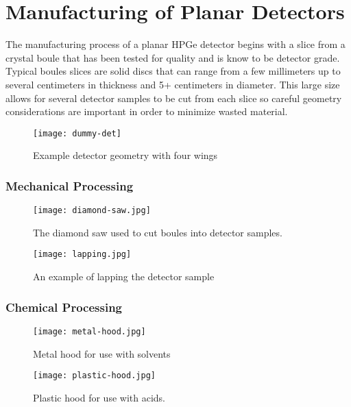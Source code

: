 \chapter{Manufacturing of Planar Detectors}
The manufacturing process of a planar HPGe detector begins with a slice from a crystal boule that has been tested for quality and is know to be detector grade. Typical boules slices are solid discs that can range from a few millimeters up to several centimeters in thickness and 5+ centimeters in diameter. This large size allows for several detector samples to be cut from each slice so careful geometry considerations are important in order to minimize wasted material.
\begin{figure}[htpb]
\centering
\texttt{[image: dummy-det]}
\caption{Example detector geometry with four wings}
\label{dummydet}
\end{figure}


\subsection{Mechanical Processing}

\begin{figure}[htpb]
\centering
\texttt{[image: diamond-saw.jpg]}
\caption{The diamond saw used to cut boules into detector samples.}
\label{diamondsaw}
\end{figure}

\begin{figure}[htpb]
\centering
\texttt{[image: lapping.jpg]}
\caption{An example of lapping the detector sample}
\label{lapping}
\end{figure}

\subsection{Chemical Processing}

\begin{figure}[htpb]
\centering
\texttt{[image: metal-hood.jpg]}
\caption{Metal hood for use with solvents}
\label{metalhood}
\end{figure}


\begin{figure}[htpb]
\centering
\texttt{[image: plastic-hood.jpg]}
\caption{Plastic hood for use with acids.}
\label{plastichood}
\end{figure}




